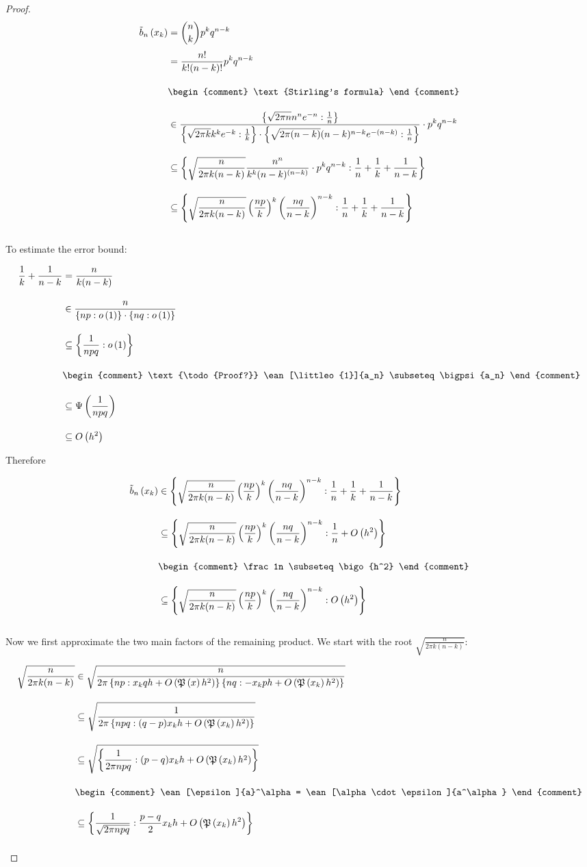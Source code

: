 \begin{proof}
  \begin{align}
    \bb{\x} &= \binom nk p^k q^{n-k} \nl
    &= \frac{n!}{k!(n-k)!} p^k q^{n-k} \bnl
    & \begin{comment} \text{Stirling's formula} \end{comment} \bnl
    &\in \frac{\ean[\frac 1n]{\sqrt{2\pi n}n^n e^{-n}}}{\ean[\frac 1k]{\sqrt{2\pi k}k^k e^{-k}}\cdot \ean[\frac 1n]{\sqrt{2\pi (n-k)}(n-k)^{n-k} e^{-(n-k)}}} \cdot p^k q^{n-k} \bnl
    & \subseteq \ean[\frac 1n + \frac 1k + \frac 1{n-k}]{\sqrt{\frac{n}{2\pi k (n-k)}} \frac{n^n}{k^k(n-k)^{(n-k)}}\cdot p^k q^{n-k}} \bnl
    & \subseteq \ean[\frac 1n + \frac 1k + \frac 1{n-k}]{\sqrt{\frac{n}{2\pi k (n-k)}} \left(\frac{np}{k}\right)^k \left(\frac{nq}{n-k}\right)^{n-k}} \bnl
  \end{align}

  \noindent To estimate the error bound:

  \begin{align}
    \frac 1k + \frac 1{n-k} & = \frac{n}{k(n-k)} \bnl
    & \in \frac{n}{\ean[\littleo{1}]{np}\cdot \ean[\littleo{1}]{nq}} \bnl
    & \subseteq \ean[\littleo{1}]{\frac{1}{npq}} \bnl
    &
    \begin{comment}
      \text{\todo{Proof?}} \ean[\littleo{1}]{a_n} \subseteq \bigpsi{a_n}
    \end{comment} \bnl
    & \subseteq \bigpsi{\frac{1}{npq}} \bnl
    & \subseteq \bigo{h^2}
  \end{align}

  \noindent Therefore

  \begin{align}
    \bb{\x} & \in \ean[\frac 1n + \frac 1k + \frac 1{n-k}]{\sqrt{\frac{n}{2\pi k (n-k)}} \left(\frac{np}{k}\right)^k \left(\frac{nq}{n-k}\right)^{n-k}} \bnl
    & \subseteq \ean[\frac 1n + \bigo{h^2}]{\sqrt{\frac{n}{2\pi k (n-k)}} \left(\frac{np}{k}\right)^k \left(\frac{nq}{n-k}\right)^{n-k}} \bnl
    &
    \begin{comment}
      \frac 1n \subseteq \bigo{h^2}
    \end{comment} \bnl
    & \subseteq \ean[\bigo{h^2}]{\sqrt{\frac{n}{2\pi k (n-k)}} \left(\frac{np}{k}\right)^k \left(\frac{nq}{n-k}\right)^{n-k}} \bnl
  \end{align}

  Now we first approximate the two main factors of the remaining product. We start with the root $\sqrt{\frac{n}{2\pi k(n-k)}}$:

  \begin{align}
    \sqrt{\frac{n}{2\pi k(n-k)}} & \in \sqrt{\frac{n}{2\pi \ean[\x qh +\bigo{\pol{x}h^2}]{np} \ean[-\x ph + \bigo{\pol{\x}h^2}]{nq}}} \bnl
    & \subseteq \sqrt{\frac{1}{2\pi \ean[(q-p)\x h +\bigo{\pol{\x}h^2}]{npq}}} \bnl
    & \subseteq \sqrt{\ean[(p-q) \x h + \bigo{\pol{\x}h^2}]{\frac{1}{2\pi npq}}} \bnl
    &
    \begin{comment}
      \ean[\epsilon]{a}^\alpha = \ean[\alpha \cdot \epsilon]{a^\alpha}
    \end{comment} \bnl
    & \subseteq \ean[\frac{p-q}2 \x h + \bigo{\pol{\x}h^2}]{\frac{1}{\sqrt{2\pi npq}}} \bnl
  \end{align}


\end{proof}
